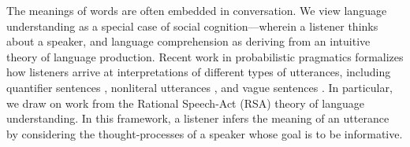 \documentclass[10pt,letterpaper]{article}
\begin{document}
The meanings of words are often embedded in conversation.
We view language understanding as a special case of social cognition---wherein a listener thinks about a speaker, and language comprehension as deriving from an intuitive theory of language production.  
Recent work in probabilistic pragmatics formalizes how listeners arrive at interpretations of different types of utterances, including quantifier sentences \cite{Goodman2013}, nonliteral utterances \cite{Kao2014}, and vague sentences \cite{Lassiter2015}.
In particular, we draw on work from the Rational Speech-Act (RSA) theory of language understanding. 
In this framework, a listener infers the meaning of an utterance by considering the thought-processes of a speaker whose goal is to be informative. 




\end{document}
